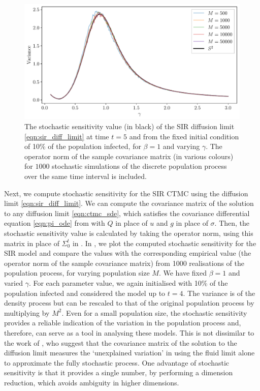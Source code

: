\begin{figure}
	\centering
	\includegraphics[width=\textwidth]{chp07_outlook/figures/sir/sir_s2_R0}
	\caption{The stochastic sensitivity value (in black) of the SIR diffusion limit \cref{eqn:sir_diff_limit} at time \(t = 5\) and from the fixed initial condition of 10\% of the population infected, for \(\beta = 1\) and varying \(\gamma\).
		The operator norm of the sample covariance matrix (in various colours) for \(1000\) stochastic simulations of the discrete population process over the same time interval is included.}
	\label{fig:sir_s2}
\end{figure}

Next, we compute stochastic sensitivity for the SIR CTMC using the diffusion limit \cref{eqn:sir_diff_limit}.
We can compute the covariance matrix of the solution to any diffusion limit \cref{eqn:ctmc_sde}, which satisfies the covariance differential equation \cref{eqn:pi_ode} from  with \(Q\) in place of \(u\) and \(g\) in place of \(\sigma\).
Then, the stochastic sensitivity value is calculated by taking the operator norm, using this matrix in place of \(\Sigma_0^t\) in .
In , we plot the computed stochastic sensitivity for the SIR model and compare the values with the corresponding empirical value (the operator norm of the sample covariance matrix) from 1000 realisations of the population process, for varying population size \(M\).
We have fixed \(\beta = 1\) and varied \(\gamma\).
For each parameter value, we again initialised with 10\% of the population infected and considered the model up to \(t = 4\).
The variance is of the density process but can be rescaled to that of the original population process by multiplying by \(M^2\).
Even for a small population size, the stochastic sensitivity provides a reliable indication of the variation in the population process and, therefore, can serve as a tool in analysing these models.
This is not dissimilar to the work of \citet{PollettEtAl_2010_ModellingPopulationProcesses}, who suggest that the covariance matrix of the solution to the diffusion limit measures the `unexplained variation' in using the fluid limit alone to approximate the fully stochastic process.
One advantage of stochastic sensitivity is that it provides a single number, by performing a dimension reduction, which avoids ambiguity in higher dimensions. %


